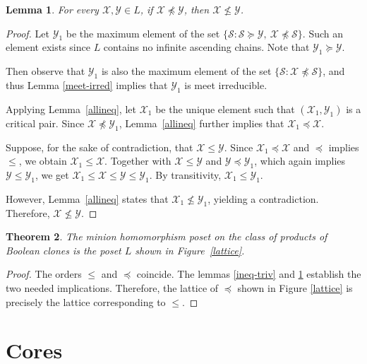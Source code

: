 \documentclass{amsart}
\numberwithin{equation}{section}
\theoremstyle{plain}
\newtheorem{theorem}{Theorem}[section]
\newtheorem{lemma}[theorem]{Lemma}
\theoremstyle{definition}
\def\clone#1{\mathcal{#1}}
\begin{document}
\begin{lemma}
\label{final}
  For every $\clone{X},\clone{Y}\in L$, if $\clone{X}\not\preceq \clone{Y}$, then $\clone{X}\not\leq \clone{Y}$.
\end{lemma}
\begin{proof}
  Let $\clone{Y}_1$ be the maximum element of the set $\{\clone{S}: \clone{S}\succeq \clone{Y},\ \clone{X}\not\preceq \clone{S}\}$. Such an element exists since $L$ contains no infinite ascending chains. Note that $\clone{Y}_1\succeq \clone{Y}$. 
  
  Then observe that $\clone{Y}_1$ is also the maximum element of the set $\{\clone{S}: \clone{X}\not\preceq \clone{S}\}$, and thus Lemma \ref{meet-irred} implies that $\clone{Y}_1$ is meet irreducible. 

Applying Lemma~\ref{allineq}, let $\clone{X}_1$ be the unique element such that $(\clone{X}_1,\clone{Y}_1)$ is a critical pair. Since $\clone{X}\not\preceq \clone{Y}_1$, Lemma~\ref{allineq} further implies that $\clone{X}_1\preceq \clone{X}$.

Suppose, for the sake of contradiction, that $\clone{X}\leq \clone{Y}$. Since $\clone{X}_1\preceq \clone{X}$ and $\preceq$ implies $\leq$, we obtain $\clone{X}_1\leq \clone{X}$. Together with $\clone{X}\leq\clone{Y}$ and $\clone{Y}\preceq\clone{Y}_1$, which again implies $\clone{Y}\leq\clone{Y}_1$, we get $\clone{X}_1\leq \clone{X}\leq \clone{Y}\leq \clone{Y}_1$. By transitivity, $\clone{X}_1\leq \clone{Y}_1$.

However, Lemma~\ref{allineq} states that $\clone{X}_1\not\leq \clone{Y}_1$, yielding a contradiction. Therefore, $\clone{X}\not\leq \clone{Y}$.
\end{proof}



\begin{theorem}  
The minion homomorphism poset on the class of products of Boolean clones is the poset $L$ shown in Figure~\ref{lattice}.
\end{theorem}

\begin{proof}
The orders $\leq$ and $\preceq$ coincide. The lemmas \ref{ineq-triv} and \ref{final} establish the two needed implications. Therefore, the lattice of $\preceq$ shown in Figure \ref{lattice} is precisely the lattice corresponding to $\leq$.
\end{proof}


\section{Cores}
\end{document}
